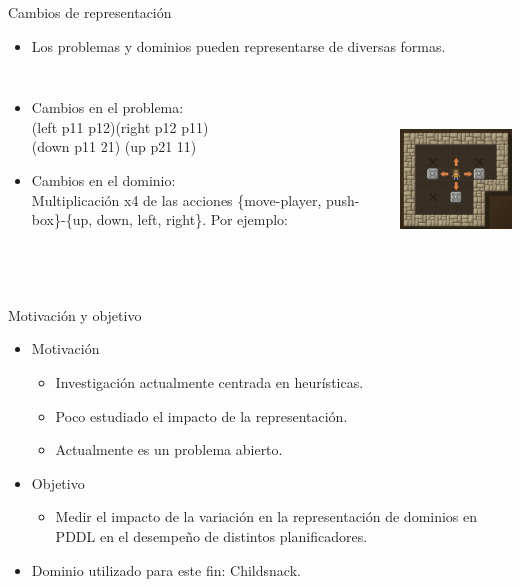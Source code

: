 \documentclass{beamer}
\begin{document}
\begin{frame}{Cambios de representación}
    \begin{itemize}
        \item Los problemas y dominios pueden representarse de diversas formas.
    \end{itemize}
    \begin{columns}
    \begin{itemize}
        \item Cambios en el problema: \\
        (left p11 p12)(right p12 p11) \\
        (down p11 21) (up p21 11)
        \item Cambios en el dominio: \\
        Multiplicación x4 de las acciones \{move-player, push-box\}-\{up, down, left, right\}. Por ejemplo:\\
        
    \end{itemize}
    \includegraphics[width=5cm,height=5cm]{sokoban}
    \end{columns}
\end{frame}


\begin{frame}{Motivación y objetivo}
    \begin{itemize}
        \item Motivación
        \begin{itemize}
            \item Investigación actualmente centrada en heurísticas.
            \item Poco estudiado el impacto de la representación.
            \item Actualmente es un problema abierto.
        \end{itemize}
        \item Objetivo
        \begin{itemize}
            \item Medir el impacto de la variación en la representación de dominios en PDDL en el desempeño de distintos planificadores.
        \end{itemize}
        \item Dominio utilizado para este fin: Childsnack.
    \end{itemize}
\end{frame}
\end{document}
